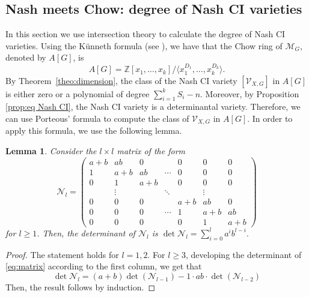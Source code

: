 \documentclass[11pt]{amsart}
\numberwithin{equation}{section}
\theoremstyle{plain}
\numberwithin{theorem}{section}
\newtheorem{lemma}[theorem]{Lemma}
\theoremstyle{definition}
\newcommand{\Z}{{\mathbb Z}}
\newcommand{\Mg}{{\mathcal M}_G}
\newcommand{\Vc}{{\mathcal V}_{X,G}}
\begin{document}
\subsection{Nash meets Chow: degree of Nash CI varieties}\label{sec:Nash and Chow}

In this section we use intersection theory to calculate the degree of Nash CI varieties.
Using the K\"unneth formula (see \cite[Theorem 2.10]{eisenbud20163264}), we have that the Chow ring of $\Mg$, denoted by $A[G]$, is 
\begin{equation}\label{eq:chow segre}
A[G]=\Z[x_1,\ldots,x_k]/\langle x_1^{D_1},\ldots,x_k^{D_k}\rangle.
\end{equation}
By Theorem~\ref{theo:dimension}, the class of the Nash CI variety $[\Vc]$ in $A[G]$ is either zero or a polynomial of degree $\sum_{i=1}^k S_i-n$. Moreover, by Proposition \ref{prop:eq Nash CI}, the Nash CI variety is a determinantal variety. Therefore, we can use Porteous' formula \cite[Theorem 12.4]{eisenbud20163264} to compute the class of $\Vc$ in $A[G]$. In order to apply this formula, we use the following lemma.

\begin{lemma}\label{lemma:matrix}
    Consider the $l\times l$ matrix of the form
    \begin{equation}\label{eq:matrix}
    \mathcal N_l=\begin{pmatrix}
        a+b& ab&0  &       &    0   &0&0      \\
        1 & a+b& ab &\cdots &   0   &0&0     \\
        0 & 1 & a+b &      &    0    &0&0       \\
          & \vdots& & \ddots &      & \vdots   &   \\
        0 & 0    &0&        &  a+b & ab &0 \\
         0 & 0    &0&  \cdots      &  1 & a+b& ab\\
          0 & 0    &0&        & 0  &  1&a+b
    \end{pmatrix}
    \end{equation}
    for $l\geq 1$. Then, the determinant of $\mathcal N_l$ is
    $
    \det \mathcal N_l = \displaystyle \sum_{i=0}^la^ib^{l-i}.
   $
\end{lemma}
\begin{proof}
The statement holds for $l=1,2$. For $l\ge3$, developing the determinant of \eqref{eq:matrix} according to the first column,
we get that 
 $$\det\mathcal N_l=(a+b)\det(\mathcal N_{l-1})-1\cdot ab\cdot\det(\mathcal N_{l-2})$$
Then, the result follows by induction.
\end{proof}
\end{document}
